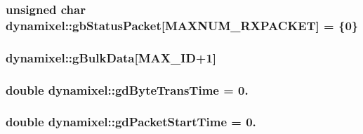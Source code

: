 \subsubsection[{gb\+Status\+Packet}]{\setlength{\rightskip}{0pt plus 5cm}unsigned char dynamixel\+::gb\+Status\+Packet\mbox{[}{\bf M\+A\+X\+N\+U\+M\+\_\+\+R\+X\+P\+A\+C\+K\+E\+T}\mbox{]} = \{0\}\hspace{0.3cm}{\ttfamily [private]}}\label{classdynamixel_aa57c86d3bbbeaf5c9d4f6bd00376b04f}
\hypertarget{classdynamixel_a953aee387e1b1a919be73017a368c777}{}
\subsubsection[{g\+Bulk\+Data}]{ dynamixel\+::g\+Bulk\+Data\mbox{[}{\bf M\+A\+X\+\_\+\+I\+D}+1\mbox{]}\hspace{0.3cm}{\ttfamily [private]}}\label{classdynamixel_a953aee387e1b1a919be73017a368c777}
\hypertarget{classdynamixel_a2173f25c6299da7ddb37ba3d2bf1f738}{}
\subsubsection[{gd\+Byte\+Trans\+Time}]{\setlength{\rightskip}{0pt plus 5cm}double dynamixel\+::gd\+Byte\+Trans\+Time = 0.\hspace{0.3cm}{\ttfamily [private]}}\label{classdynamixel_a2173f25c6299da7ddb37ba3d2bf1f738}
\hypertarget{classdynamixel_a6c6314fb7070e6fd361e57c5de17e0ec}{}
\subsubsection[{gd\+Packet\+Start\+Time}]{\setlength{\rightskip}{0pt plus 5cm}double dynamixel\+::gd\+Packet\+Start\+Time = 0.\hspace{0.3cm}{\ttfamily [private]}}\label{classdynamixel_a6c6314fb7070e6fd361e57c5de17e0ec}
\hypertarget{classdynamixel_a9f47887864517d74955a2bc787ae4456}{}
